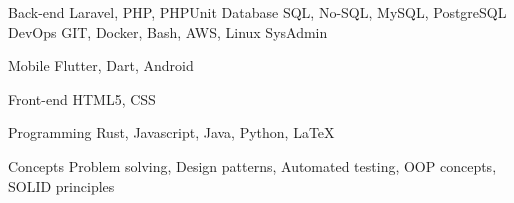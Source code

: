 

\begin{cvskills}

  \cvskill
    {Back-end} %
    {
      Laravel, PHP, PHPUnit
    } %
  \cvskill
    {Database} %
    {
      SQL, No-SQL, MySQL, PostgreSQL
    } %
  \cvskill
    {DevOps} %
    {GIT, Docker, Bash, AWS, Linux SysAdmin} %

  \cvskill
    {Mobile} %
    {Flutter, Dart, Android} %

  \cvskill
    {Front-end} %
    {HTML5, CSS} %

  \cvskill
    {Programming} %
    {Rust, Javascript, Java, Python, LaTeX} %

  \cvskill
    {Concepts} %
    {Problem solving, Design patterns, Automated testing, OOP concepts, SOLID principles} %

\end{cvskills}
